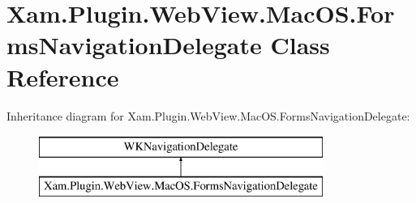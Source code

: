 \hypertarget{class_xam_1_1_plugin_1_1_web_view_1_1_mac_o_s_1_1_forms_navigation_delegate}{}\section{Xam.\+Plugin.\+Web\+View.\+Mac\+O\+S.\+Forms\+Navigation\+Delegate Class Reference}
\label{class_xam_1_1_plugin_1_1_web_view_1_1_mac_o_s_1_1_forms_navigation_delegate}
Inheritance diagram for Xam.\+Plugin.\+Web\+View.\+Mac\+O\+S.\+Forms\+Navigation\+Delegate\+:\begin{figure}[H]
\begin{center}
\leavevmode
\includegraphics[height=2.000000cm]{class_xam_1_1_plugin_1_1_web_view_1_1_mac_o_s_1_1_forms_navigation_delegate}
\end{center}
\end{figure}
